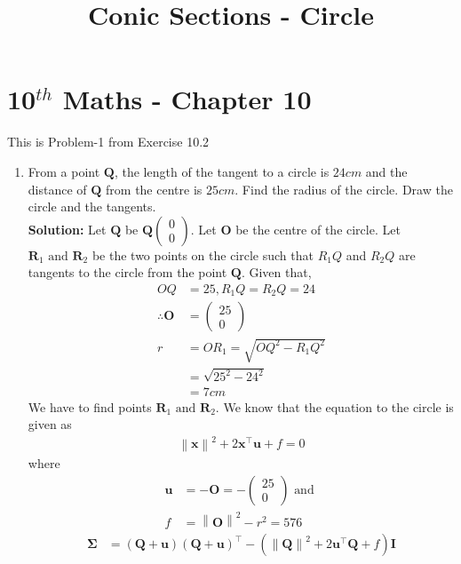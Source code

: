 \documentclass[12pt]{article}
\providecommand{\brak}[1]{\ensuremath{\left(#1\right)}}
\providecommand{\norm}[1]{\left\lVert#1\right\rVert}
\newcommand{\solution}{\noindent \textbf{Solution: }}
\newcommand{\myvec}[1]{\ensuremath{\begin{pmatrix}#1\end{pmatrix}}}
\let\vec\mathbf
\begin{document}
\begin{center}
\title{\textbf{Conic Sections - Circle}}
\date{\vspace{-5ex}} %
\maketitle
\end{center}
\setcounter{page}{1}

\section{10$^{th}$ Maths - Chapter 10}
This is Problem-1 from Exercise 10.2
\begin{enumerate}
\item From a point $\vec{Q}$, the length of the tangent to a circle is $24 cm$ and the distance of $\vec{Q}$ from the centre is $25 cm$. Find the radius of the circle. Draw the circle and the tangents. \\ 
\solution 
Let $\vec{Q}$ be $\vec{Q}\myvec{0 \\ 0}$. Let $\vec{O}$ be the centre of the circle. Let $\vec{R}_1 \text{ and } \vec{R}_2$ be the two points on the circle such that $R_1Q$ and $R_2Q$ are tangents to the circle from the point $\vec{Q}$. Given that,  
\begin{align}
	OQ &= 25, R_1Q = R_2Q = 24 \\ 
	\therefore \vec{O} &= \myvec{25 \\ 0} \\
	r &= OR_1 = \sqrt{OQ^2 - R_1Q^2}  \\
	&= \sqrt{25^2 - 24^2} \\
	&= 7cm
\end{align}
We have to find points $\vec{R}_1 \text{ and } \vec{R}_2$. 
We know that the equation to the circle is given as
\begin{align}
	\label{eq:circEq1}
	\norm{\vec{x}}^2+2\vec{x}^\top\vec{u}+f = 0 
\end{align}
where
\begin{align}
	\vec{u} &= -\vec{O}  = -\myvec{25\\0}\text{ and } \\
        \label{eq:fRelation}
	f &= \norm{\vec{O}}^2 - r^2 = 576
\end{align}
\begin{align}
	\vec{\Sigma} &= \brak{\vec{Q}+\vec{u}}\brak{\vec{Q}+\vec{u}}^\top - \brak{\norm{\vec{Q}}^2+2\vec{u}^\top\vec{Q}+f}\vec{I}
\end{align}

\end{enumerate}
\end{document}
